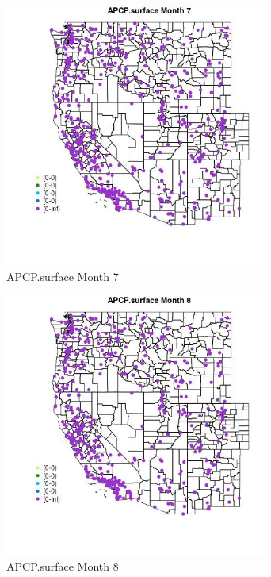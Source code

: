 \begin{figure} 
\centering  
\includegraphics[width=0.77\textwidth]{Code_Outputs/Report_ML_input_PM25_Step4_part_e_de_duplicated_aves_compiled_2019-05-14wNAs_MapObsMo7APCPsurface.jpg} 
\caption{\label{fig:Report_ML_input_PM25_Step4_part_e_de_duplicated_aves_compiled_2019-05-14wNAsMapObsMo7APCPsurface}APCP.surface Month 7} 
\end{figure} 
 

\begin{figure} 
\centering  
\includegraphics[width=0.77\textwidth]{Code_Outputs/Report_ML_input_PM25_Step4_part_e_de_duplicated_aves_compiled_2019-05-14wNAs_MapObsMo8APCPsurface.jpg} 
\caption{\label{fig:Report_ML_input_PM25_Step4_part_e_de_duplicated_aves_compiled_2019-05-14wNAsMapObsMo8APCPsurface}APCP.surface Month 8} 
\end{figure} 
 

